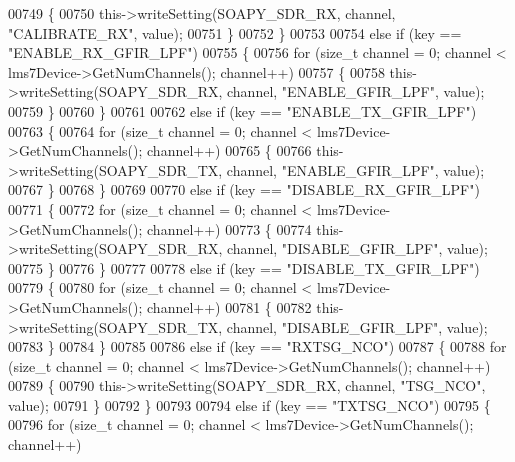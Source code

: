 \begin{DoxyCode}
{{{{{{{{{{{{{{00749         \{
00750             this->writeSetting(SOAPY_SDR_RX, channel, \textcolor{stringliteral}{"CALIBRATE\_RX"}, value);
00751         \}
00752     \}
00753 
00754     \textcolor{keywordflow}{else} \textcolor{keywordflow}{if} (key == \textcolor{stringliteral}{"ENABLE\_RX\_GFIR\_LPF"})
00755     \{
00756         \textcolor{keywordflow}{for} (\textcolor{keywordtype}{size\_t} channel = 0; channel < lms7Device->GetNumChannels(); channel++)
00757         \{
00758             this->writeSetting(SOAPY_SDR_RX, channel, \textcolor{stringliteral}{"ENABLE\_GFIR\_LPF"}, value);
00759         \}
00760     \}
00761 
00762     \textcolor{keywordflow}{else} \textcolor{keywordflow}{if} (key == \textcolor{stringliteral}{"ENABLE\_TX\_GFIR\_LPF"})
00763     \{
00764         \textcolor{keywordflow}{for} (\textcolor{keywordtype}{size\_t} channel = 0; channel < lms7Device->GetNumChannels(); channel++)
00765         \{
00766             this->writeSetting(SOAPY_SDR_TX, channel, \textcolor{stringliteral}{"ENABLE\_GFIR\_LPF"}, value);
00767         \}
00768     \}
00769 
00770     \textcolor{keywordflow}{else} \textcolor{keywordflow}{if} (key == \textcolor{stringliteral}{"DISABLE\_RX\_GFIR\_LPF"})
00771     \{
00772         \textcolor{keywordflow}{for} (\textcolor{keywordtype}{size\_t} channel = 0; channel < lms7Device->GetNumChannels(); channel++)
00773         \{
00774             this->writeSetting(SOAPY_SDR_RX, channel, \textcolor{stringliteral}{"DISABLE\_GFIR\_LPF"}, value);
00775         \}
00776     \}
00777 
00778     \textcolor{keywordflow}{else} \textcolor{keywordflow}{if} (key == \textcolor{stringliteral}{"DISABLE\_TX\_GFIR\_LPF"})
00779     \{
00780         \textcolor{keywordflow}{for} (\textcolor{keywordtype}{size\_t} channel = 0; channel < lms7Device->GetNumChannels(); channel++)
00781         \{
00782             this->writeSetting(SOAPY_SDR_TX, channel, \textcolor{stringliteral}{"DISABLE\_GFIR\_LPF"}, value);
00783         \}
00784     \}
00785 
00786     \textcolor{keywordflow}{else} \textcolor{keywordflow}{if} (key == \textcolor{stringliteral}{"RXTSG\_NCO"})
00787     \{
00788         \textcolor{keywordflow}{for} (\textcolor{keywordtype}{size\_t} channel = 0; channel < lms7Device->GetNumChannels(); channel++)
00789         \{
00790             this->writeSetting(SOAPY_SDR_RX, channel, \textcolor{stringliteral}{"TSG\_NCO"}, value);
00791         \}
00792     \}
00793 
00794     \textcolor{keywordflow}{else} \textcolor{keywordflow}{if} (key == \textcolor{stringliteral}{"TXTSG\_NCO"})
00795     \{
00796         \textcolor{keywordflow}{for} (\textcolor{keywordtype}{size\_t} channel = 0; channel < lms7Device->GetNumChannels(); channel++)
}}}}}}}}}}}}}}
\end{DoxyCode}
